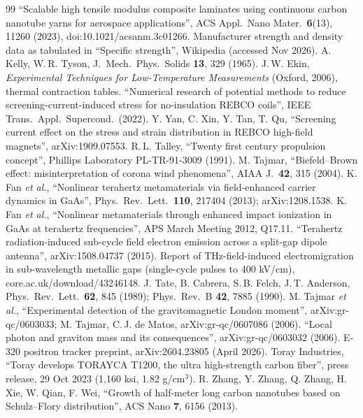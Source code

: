 \begin{thebibliography}{99}
 ``Scalable high tensile modulus composite laminates using continuous carbon nanotube yarns for aerospace applications'', ACS Appl.\ Nano Mater.\ \textbf{6}(13), 11260 (2023), doi:10.1021/acsanm.3c01266.
 Manufacturer strength and density data as tabulated in ``Specific strength'', Wikipedia (accessed Nov 2026).
 A. Kelly, W.\,R. Tyson, J.\ Mech.\ Phys.\ Solids \textbf{13}, 329 (1965).
 J.\,W. Ekin, \emph{Experimental Techniques for Low-Temperature Measurements} (Oxford, 2006), thermal contraction tables.
 ``Numerical research of potential methods to reduce screening-current-induced stress for no-insulation REBCO coils'', IEEE Trans.\ Appl.\ Supercond.\ (2022).
 Y. Yan, C. Xin, Y. Tan, T. Qu, ``Screening current effect on the stress and strain distribution in REBCO high-field magnets'', arXiv:1909.07553.
 R.\,L. Talley, ``Twenty first century propulsion concept'', Phillips Laboratory PL-TR-91-3009 (1991).
 M. Tajmar, ``Biefeld--Brown effect: misinterpretation of corona wind phenomena'', AIAA J.\ \textbf{42}, 315 (2004).
 K. Fan \emph{et al.}, ``Nonlinear terahertz metamaterials via field-enhanced carrier dynamics in GaAs'', Phys.\ Rev.\ Lett.\ \textbf{110}, 217404 (2013); arXiv:1208.1538.
 K. Fan \emph{et al.}, ``Nonlinear metamaterials through enhanced impact ionization in GaAs at terahertz frequencies'', APS March Meeting 2012, Q17.11.
 ``Terahertz radiation-induced sub-cycle field electron emission across a split-gap dipole antenna'', arXiv:1508.04737 (2015).
 Report of THz-field-induced electromigration in sub-wavelength metallic gaps (single-cycle pulses to 400 kV/cm), core.ac.uk/download/43246148.
 J. Tate, B. Cabrera, S.\,B. Felch, J.\,T. Anderson, Phys.\ Rev.\ Lett.\ \textbf{62}, 845 (1989); Phys.\ Rev.\ B \textbf{42}, 7885 (1990).
 M. Tajmar \emph{et al.}, ``Experimental detection of the gravitomagnetic London moment'', arXiv:gr-qc/0603033; M. Tajmar, C.\,J. de Matos, arXiv:gr-qc/0607086 (2006).
 ``Local photon and graviton mass and its consequences'', arXiv:gr-qc/0603032 (2006).
 E-320 positron tracker preprint, arXiv:2604.23805 (April 2026).
 Toray Industries, ``Toray develops TORAYCA T1200, the ultra high-strength carbon fiber'', press release, 29 Oct 2023 (1,160 ksi, 1.82 g/cm$^3$).
 R. Zhang, Y. Zhang, Q. Zhang, H. Xie, W. Qian, F. Wei, ``Growth of half-meter long carbon nanotubes based on Schulz--Flory distribution'', ACS Nano \textbf{7}, 6156 (2013).

\end{thebibliography}
